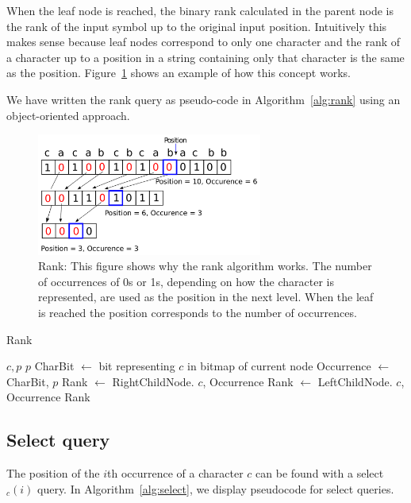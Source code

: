 When the leaf node is reached, the binary rank calculated in the parent node is the rank of the input symbol up to the original input position.
Intuitively this makes sense because leaf nodes correspond to only one character and the rank of a character up to a position in a string containing only that character is the same as the position.
Figure~\ref{fig:RankDrawing} shows an example of how this concept works.

We have written the rank query as pseudo-code in Algorithm~\ref{alg:rank} using an object-oriented approach.

\begin{figure}
\center \includegraphics[width=0.66\textwidth]{RankDrawing}
\caption{Rank: This figure shows why the rank algorithm works. The number of occurrences of 0s or 1s, depending on how the character is represented, are used as the position in the next level. 
When the leaf is reached the position corresponds to the number of occurrences.}
\label{fig:RankDrawing}
\end{figure}

\begin{algorithm}
\caption{Rank}
\label{alg:rank}
\begin{algorithmic} 
 {$c, p$}
\State \Return $p$
\EndIf
\State CharBit $\gets$ bit representing $c$ in bitmap of current node
\State Occurrence $\gets$  {CharBit, $p$}
	\State Rank $\gets$ RightChildNode. {$c$, Occurrence}
\Else
	\State Rank $\gets$ LeftChildNode. {$c$, Occurrence}
\EndIf
\State \Return Rank
\EndFunction
\end{algorithmic}
\end{algorithm}


\subsection{Select query}
\label{sec:selectDescription}
The position of the $i$th occurrence of a character $c$ can be found with a select$_c(i)$ query.
In Algorithm~\ref{alg:select}, we display pseudocode for select queries.


